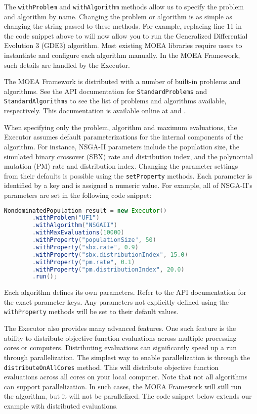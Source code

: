 The \texttt{withProblem} and \texttt{withAlgorithm} methods allow us to specify the problem and algorithm by name.  Changing the problem or algorithm is as simple as changing the string passed to these methods.  For example, replacing line 11 in the code snippet above to  will now allow you to run the Generalized Differential Evolution 3 (GDE3) algorithm.  Most existing MOEA libraries require users to instantiate and configure each algorithm manually.  In the MOEA Framework, such details are handled by the Executor.

The MOEA Framework is distributed with a number of built-in problems and algorithms.  See the API documentation for \texttt{StandardProblems} and \texttt{StandardAlgorithms} to see the list of problems and algorithms available, respectively.  This documentation is available online at  and .

When specifying only the problem, algorithm and maximum evaluations, the Executor assumes default parameterizations for the internal components of the algorithm.  For instance, NSGA-II parameters include the population size, the simulated binary crossover (SBX) rate and distribution index, and the polynomial mutation (PM) rate and distribution index.  Changing the parameter settings from their defaults is possible using the \texttt{setProperty} methods.  Each parameter is identified by a key and is assigned a numeric value.  For example, all of NSGA-II's parameters are set in the following code snippet:

\begin{lstlisting}[language=Java]
NondominatedPopulation result = new Executor()
		.withProblem("UF1")
		.withAlgorithm("NSGAII")
		.withMaxEvaluations(10000)
		.withProperty("populationSize", 50)
		.withProperty("sbx.rate", 0.9)
		.withProperty("sbx.distributionIndex", 15.0)
		.withProperty("pm.rate", 0.1)
		.withProperty("pm.distributionIndex", 20.0)
		.run();
\end{lstlisting}

Each algorithm defines its own parameters.  Refer to the API documentation for the exact parameter keys.  Any parameters not explicitly defined using the \texttt{withProperty} methods will be set to their default values.

The Executor also provides many advanced features.  One such feature is the ability to distribute objective function evaluations across multiple processing cores or computers.  Distributing evaluations can significantly speed up a run through parallelization.  The simplest way to enable parallelization is through the \texttt{distributeOnAllCores} method.  This will distribute objective function evaluations across all cores on your local computer.  Note that not all algorithms can support parallelization.  In such cases, the MOEA Framework will still run the algorithm, but it will not be parallelized.  The code snippet below extends our example with distributed evaluations.

